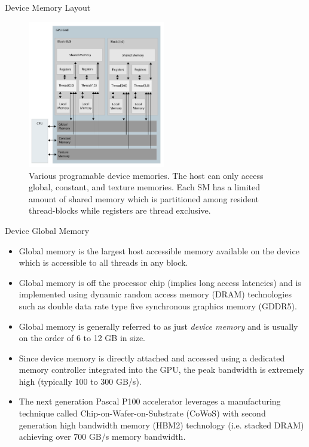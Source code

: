 \documentclass[handout]{beamer}
\begin{document}
\begin{frame}{Device Memory Layout}
\begin{figure}
\begin{center}
\includegraphics[width=6cm]{../media/cuda_mem.pdf}
\caption{Various programable device memories.  The host can only access global, constant, and texture memories.  Each SM has a limited amount of shared memory which is partitioned among resident thread-blocks while registers are thread exclusive.}
\end{center}
\end{figure}
\end{frame}

\begin{frame}{Device Global Memory}
\begin{itemize}
	\item<1->Global memory is the largest host accessible memory available on the device which is accessible to all threads in any block.  
	\item<1->Global memory is off the processor chip (implies long access latencies) and is implemented using dynamic random access memory (DRAM) technologies such as double data rate type five synchronous graphics memory (GDDR5).
	\item<1->Global memory is generally referred to as just \emph{device memory} and is usually on the order of 6 to 12 GB in size.
	\item<1->Since device memory is directly attached and accessed using a dedicated memory controller integrated into the GPU, the peak bandwidth is extremely high (typically 100 to 300 GB/s). 
	\item<1->The next generation Pascal P100 accelerator leverages a manufacturing technique called Chip-on-Wafer-on-Substrate (CoWoS) with second generation high bandwidth memory (HBM2) technology (i.e. stacked DRAM) achieving over 700 GB/s memory bandwidth.
\end{itemize}
\end{frame}
\end{document}

